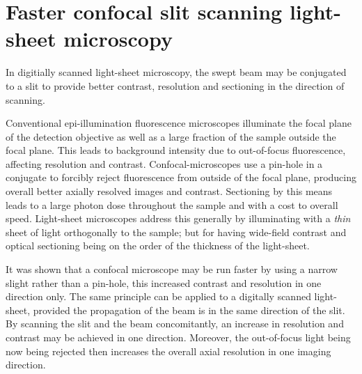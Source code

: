 \ifpdf
    \graphicspath{{Chapters/dualslit/Figs/Raster/}{Chapters/dualslit/Figs/PDF/}{Chapters/dualslit/Figs/}}
\else
    \graphicspath{{Chapters/dualslit/Figs/Vector/}{Chapters/dualslit/Figs/}}
\fi

\chapter{Faster confocal slit scanning light-sheet microscopy}

In digitially scanned light-sheet microscopy, the swept beam may be conjugated to a slit to provide better contrast, resolution and sectioning in the direction of scanning.

Conventional epi-illumination fluorescence microscopes illuminate the focal plane of the detection objective as well as a large fraction of the sample outside the focal plane.
This leads to background intensity due to out-of-focus fluorescence, affecting resolution and contrast.
Confocal-microscopes use a pin-hole in a conjugate to forcibly reject fluorescence from outside of the focal plane, producing overall better axially resolved images and contrast.
Sectioning by this means leads to a large photon dose throughout the sample and with a cost to overall speed.
Light-sheet microscopes address this generally by illuminating with a \emph{thin} sheet of light orthogonally to the sample; but for having wide-field contrast and optical sectioning being on the order of the thickness of the light-sheet.

It was shown that a confocal microscope may be run faster by using a narrow slight rather than a pin-hole, this increased contrast and resolution in one direction only.
The same principle can be applied to a digitally scanned light-sheet, provided the propagation of the beam is in the same direction of the slit.
By scanning the slit and the beam concomitantly, an increase in resolution and contrast may be achieved in one direction.
Moreover, the out-of-focus light being now being rejected then increases the overall axial resolution in one imaging direction.

